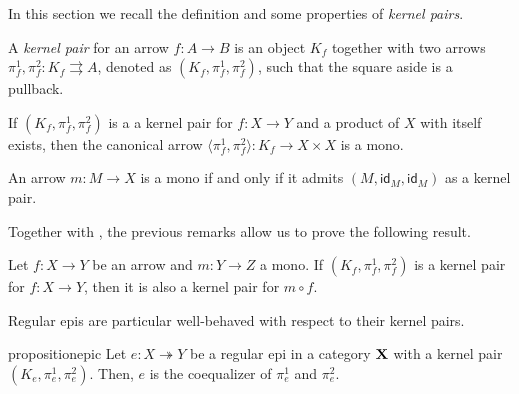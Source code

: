 \documentclass[a4paper,UKenglish,cleveref,pdftex,thm-restate,numberwithinsect]{lipics-v2021}
\def\X{\textbf {\textup{X}}}
\newcommand{\eto}{\twoheadrightarrow}
\newcommand{\id}[1]{\mathsf{id}_{#1}}
\begin{document}
In this section we recall the definition and some properties of \emph{kernel pairs}.

\noindent 
\parbox{11cm}{
\begin{definition}
    A \emph{kernel pair} for an arrow $f\colon A \to B$ is an object $K_f$ together with two arrows $\pi^1_f, \pi^2_f\colon K_f \rightrightarrows A$, denoted as $(K_f, \pi^1_f, \pi^2_f)$, such that the square aside is a pullback.
\end{definition}}\hfill 
\parbox{2cm}{}

\smallskip
\begin{remark}\label{prop:pairng_of_kernel_pairs_mono}
If $(K_f, \pi^1_f, \pi^2_f)$ is a a kernel pair for $f\colon X \to Y$ and a product of $X$ with itself exists, then the canonical arrow $\langle \pi^1_f, \pi^2_f\rangle \colon K_f \to X \times X$ is a mono.
\end{remark}

\begin{remark}\label{prop:kermono}
An arrow $m\colon M\to X$ is a mono if and only if it admits $(M, \id{M}, \id{M})$ as a kernel pair.
\end{remark}

Together with , the previous remarks allow us to prove the following result.

\begin{proposition}\label{cor:kermono}
	Let $f\colon X\to Y$ be an arrow and $m\colon Y\to Z$ a mono. If
	$(K_f, \pi_f^1, \pi_f^2)$ is a kernel pair for $f\colon X\to Y$, then it is also a kernel pair for $m\circ f$.
\end{proposition}

Regular epis are particular well-behaved with respect to their kernel pairs.

\begin{restatable}{proposition}{epic}\label{prop:reg_epi_coeq}
    Let $e\colon X \eto Y$ be a regular epi in a category $\X$ with a kernel pair $(K_e, \pi^1_e, \pi^2_e)$. Then, $e$ is the coequalizer of $\pi^1_e$ and $\pi^2_e$.
\end{restatable}
\end{document}
